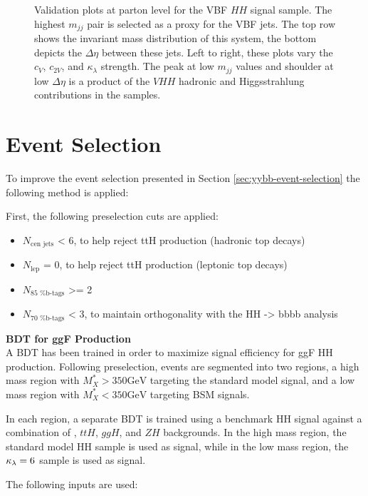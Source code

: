\begin{figure}[htbp]
    \caption{Validation plots at parton level for the VBF $HH$ signal sample. The highest $m_{jj}$ pair is selected as a proxy for the VBF jets. The top row shows the invariant mass distribution of this system, the bottom depicts the $\Delta \eta$ between these jets. Left to right, these plots vary the $c_V$, $c_{2V}$, and $\kappa_\lambda$ strength. The peak at low $m_{jj}$ values and shoulder at low $\Delta \eta$ is a product of the $VHH$ hadronic and Higgsstrahlung contributions in the samples.}
    \label{fig:vbf-mc-validation}
\end{figure}

\section{Event Selection} \label{ssec:vbf-event-selection}

To improve the event selection presented in Section \ref{sec:yybb-event-selection} the following method is applied:

First, the following preselection cuts are applied:

\begin{itemize}
	\item $N_{\text{cen jets}}$ < 6, to help reject ttH production (hadronic top decays)
	\item $N_{\text{lep}}$ = 0, to help reject ttH production (leptonic top decays)
	\item $N_{\text{85 \% b-tags}}$ >= 2 
	\item $N_{\text{70 \% b-tags}}$ < 3, to maintain orthogonality with the HH -> bbbb analysis
\end{itemize}

\noindent\textbf{BDT for ggF Production}\\
\indent A \gls{BDT} has been trained in order to maximize signal efficiency for ggF HH production. Following preselection, events are segmented into two regions, a high mass region with $M_X^{*} > 350 \text{GeV}$ targeting the standard model signal, and a low mass region with $M_X^{*} < 350 \text{GeV}$ targeting BSM signals. 

In each region, a separate BDT is trained using a benchmark HH signal against a combination of \yy, $ttH$, $ggH$, and $ZH$ backgrounds. In the high mass region, the standard model HH sample is used as signal, while in the low mass region, the $\kappa_{\lambda} = 6$ sample is used as signal.

The following inputs are used:

